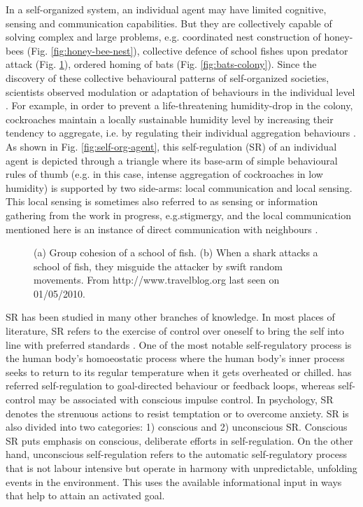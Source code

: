 % 
In a self-organized system, an individual agent may have limited cognitive, sensing and communication capabilities. But they are collectively capable of solving complex and large problems, e.g. coordinated nest construction of honey-bees (Fig. \ref{fig:honey-bee-nest}), collective defence of school fishes upon predator attack (Fig. \ref{fig:school-of-fish}), ordered homing of bats (Fig. \ref{fig:bats-colony}).  Since the discovery of these collective behavioural patterns of self-organized societies, scientists observed modulation or adaptation of behaviours in the individual level \cite{Garnier+2007}. For example, in order to prevent a life-threatening humidity-drop in the colony, cockroaches maintain a locally sustainable humidity level by increasing their tendency to aggregate, i.e. by regulating their individual aggregation behaviours . As shown in Fig. \ref{fig:self-org-agent}, this  self-regulation (SR) of an individual agent is depicted through a triangle where its base-arm of simple behavioural rules of thumb (e.g. in this case, intense aggregation of cockroaches in low humidity) is supported by two side-arms: local communication and local sensing. This local sensing is sometimes also referred to as sensing or information gathering from the work in progress, e.g.stigmergy, and the local communication mentioned here is an instance of direct communication with neighbours  \cite{Camazine+2001}.\\
\begin{figure}[htp]
\centering
{} 
\hspace{0.25cm}
\caption{(a) Group cohesion of a school of fish. (b) When a shark attacks a school of fish, they misguide the attacker by swift random movements. From http://www.travelblog.org last seen on 01/05/2010.}
\label{fig:school-of-fish}
\end{figure}
SR has been studied in many other branches of knowledge. In most places of literature, SR refers to the exercise of control over oneself to bring the self into line with preferred standards \cite{Baumeister+2007}. One of the most notable self-regulatory process is the human body's homoeostatic process where the human body's inner process seeks to return to its regular temperature when it gets overheated or chilled.  has referred self-regulation to goal-directed behaviour or feedback loops, whereas self-control may be associated with conscious impulse control.  In psychology, SR denotes the strenuous actions to resist temptation or to overcome anxiety. SR is also divided into two categories: 1) conscious and 2) unconscious SR. Conscious SR puts emphasis on conscious, deliberate efforts in self-regulation. On the other hand, unconscious self-regulation refers to the automatic self-regulatory process that is not labour intensive but operate in harmony with unpredictable, unfolding events in the environment. This uses the available informational input in ways that help to attain an activated goal.\\
